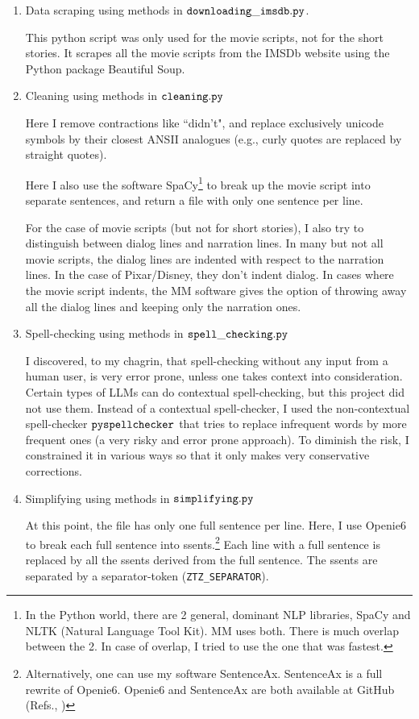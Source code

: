 \documentclass[12pt]{article}
\begin{document}
\begin{enumerate}
\item Data scraping using methods in $\tt downloading\_imsdb.py$.

This python script was only used for the movie
scripts, not for the short stories. It 
scrapes all the movie scripts from the IMSDb
website using the Python package Beautiful Soup.

\item Cleaning using methods in $\tt cleaning.py$

Here I remove contractions like ``didn't",
and replace exclusively unicode symbols 
by their closest ANSII analogues (e.g.,
curly quotes are replaced by straight quotes).

Here I also use the software SpaCy\footnote{In the Python
world, there are 2 general, dominant
NLP libraries, SpaCy and NLTK (Natural Language Tool Kit). MM uses both. There is much overlap
between the 2. In case of overlap, I tried to use the one that was fastest.} to break up the movie script into 
separate sentences, and return a file with only
one sentence per line.

For the case of movie scripts (but not for short 
stories), I also try to distinguish between 
dialog lines and narration lines.
In many but not all movie scripts, the dialog lines are indented with 
respect to the narration lines.
In the case of Pixar/Disney, they don't indent dialog. In cases where the movie script indents,
the MM software gives the option of throwing away all the dialog lines and keeping only the narration
ones.



\item Spell-checking using methods in $\tt spell\_checking.py$

I discovered, to my chagrin, that spell-checking
without any input from a human user,
is very error prone, unless one takes context into consideration. Certain types of LLMs can do contextual spell-checking, but this project did not use them.
Instead of a contextual spell-checker,
I used the non-contextual
spell-checker $\tt pyspellchecker$
that tries to replace infrequent words by
more frequent ones (a very risky
and error prone approach). To 
diminish the risk, I
 constrained it in various ways so
that it only makes very conservative corrections.

\item Simplifying using methods in $\tt simplifying.py$

At this point, the file
has only one
full sentence per line.
Here, I  use Openie6 to
break each full sentence into ssents.\footnote{Alternatively,
one can use my software SentenceAx.
SentenceAx is a full rewrite of Openie6. 
Openie6 and SentenceAx are both available at GitHub (Refs.\cite{openie6}, \cite{sentence-ax})}
Each line with a full sentence is replaced by
all the ssents derived from the full sentence.  The
ssents are separated by 
a separator-token ({\tt ZTZ\_SEPARATOR}).



\end{enumerate}
\end{document}
